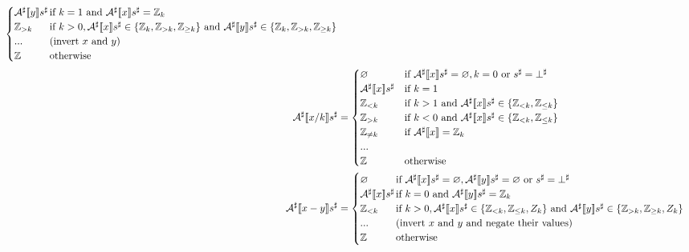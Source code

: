 \begin{exercise}
\begin{align*}
\begin{cases}
            \Asharp{y} s^\sharp \hspace*{-0.3cm} & \text{if } k = 1 \text{ and } \Asharp{x} s^\sharp = \Z_k \\
            \Z_{>k} & \text{if } k > 0, \Asharp{x} s^\sharp \in \{ \Z_k, \Z_{>k}, \Z_{\geq k} \} \text{ and } \Asharp{y} s^\sharp \in \{ \Z_k, \Z_{>k}, \Z_{\geq k} \} \\
            ... & \text{(invert $x$ and $y$)} \\
            \Z & \text{otherwise}
        \end{cases} \\
        \Asharp{x / k} s^\sharp &= \begin{cases}
            \varnothing & \text{if } \Asharp{x} s^\sharp = \varnothing, k = 0 \text{ or } s^\sharp = \bot^\sharp \\
            \Asharp{x} s^\sharp & \text{if } k = 1 \\
            \Z_{< k} & \text{if } k > 1 \text{ and } \Asharp{x} s^\sharp \in \{ \Z_{< k}, \Z_{\leq k} \} \\
            \Z_{> k} & \text{if } k < 0 \text{ and } \Asharp{x} s^\sharp \in \{ \Z_{< k}, \Z_{\leq k} \} \\
            \Z_{\neq k} & \text{if } \Asharp{x} = \Z_k \\
            ... \\
            \Z & \text{otherwise}
        \end{cases} \\
        \Asharp{x - y} s^\sharp &= \begin{cases}
            \varnothing & \text{if } \Asharp{x} s^\sharp = \varnothing, \Asharp{y} s^\sharp = \varnothing \text{ or } s^\sharp = \bot^\sharp \\
            \Asharp{x} s^\sharp \hspace*{-0.3cm} & \text{if } k = 0 \text{ and } \Asharp{y} s^\sharp = \Z_k \\
            \Z_{< k} & \text{if } k > 0, \Asharp{x} s^\sharp \in \{ \Z_{< k}, \Z_{\leq k}, Z_k \} \text{ and } \Asharp{y} s^\sharp \in \{ \Z_{> k}, \Z_{\geq k}, Z_k \} \\
            ... & \text{(invert $x$ and $y$ and negate their values)} \\
            \Z & \text{otherwise}
        \end{cases} \\
    \end{align*}
\end{exercise}

